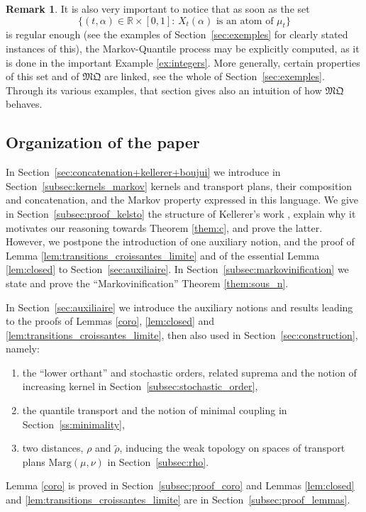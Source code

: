 \documentclass[11pt]{article}
\theoremstyle{plain}
\theoremstyle{definition}
\newtheorem{rem}[them]{Remark}
\newcommand{\mq}{\mathfrak{MQ}}
\newcommand{\ma}{\mathrm{Marg}}
\newcommand{\R}{\mathbb{R}}
\begin{document}
\begin{rem}
It is also very important to notice that as soon as the set
\[
\{(t,\alpha)\in\R\times[0,1]:\,X_t(\alpha)\text{ is an atom of }\mu_t\}
\]
is regular enough (see the examples of Section~\ref{sec:exemples} for clearly stated instances of this), the Markov-Quantile process may be explicitly computed, as it is done in the important Example \ref{ex:integers}. More generally, certain properties of this set and of $\mq$ are linked, see the whole of Section~\ref{sec:exemples}. Through its various examples, that section gives also an intuition of how $\mq$ behaves.
\end{rem}

\subsection{Organization of the paper}\label{subsec:organisation}
In Section~\ref{sec:concatenation+kellerer+boujui} we introduce in Section~\ref{subsec:kernels_markov} kernels and transport plans, their composition and concatenation, and the Markov property expressed in this language. We give in Section~\ref{subsec:proof_kelsto} the structure of Kellerer's work \cite{Ke72,Ke73}, explain why it motivates our reasoning towards Theorem \ref{them:c}, and prove the latter. However, we postpone the introduction of one auxiliary notion, and the proof of Lemma \ref{lem:transitions_croissantes_limite} and of the essential Lemma \ref{lem:closed} to Section~\ref{sec:auxiliaire}. In Section~\ref{subsec:markovinification} we state and prove the ``Markovinification'' Theorem \ref{them:sous_n}.

In Section~\ref{sec:auxiliaire} we introduce the auxiliary notions and results leading to the proofs of Lemmas \ref{coro}, \ref{lem:closed} and \ref{lem:transitions_croissantes_limite}, then also used in Section~\ref{sec:construction}, namely:
\begin{enumerate}
\item the ``lower orthant'' and stochastic orders, related suprema and the notion of increasing kernel in Section~\ref{subsec:stochastic_order},
\item the quantile transport and the notion of minimal coupling in Section~\ref{ss:minimality},
\item two distances, $\rho$ and $\tilde \rho$, inducing the weak topology on spaces of transport plans $\ma(\mu,\nu)$ in Section~\ref{subsec:rho}.
\end{enumerate}
Lemma \ref{coro} is proved in Section~\ref{subsec:proof_coro} and Lemmas \ref{lem:closed} and \ref{lem:transitions_croissantes_limite} are in Section~\ref{subsec:proof_lemmas}.
\end{document}

